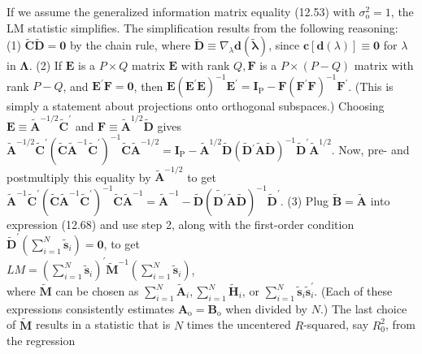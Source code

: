 \documentclass[10pt]{article}
\begin{document}
If we assume the generalized information matrix equality (12.53) with $\sigma_{\mathrm{o}}^{2}=1$, the LM statistic simplifies. The simplification results from the following reasoning: (1) $\tilde{\mathbf{C}} \tilde{\mathbf{D}}=\mathbf{0}$ by the chain rule, where $\tilde{\mathbf{D}} \equiv \nabla_{\lambda} \mathbf{d}(\tilde{\boldsymbol{\lambda}})$, since $\mathbf{c}[\mathbf{d}(\lambda)] \equiv \mathbf{0}$ for $\lambda$ in $\boldsymbol{\Lambda}$. (2) If $\mathbf{E}$ is a $P \times Q$ matrix $\mathbf{E}$ with rank $Q, \mathbf{F}$ is a $P \times(P-Q)$ matrix with rank $P-Q$, and $\mathbf{E}^{\prime} \mathbf{F}=\mathbf{0}$, then $\mathbf{E}\left(\mathbf{E}^{\prime} \mathbf{E}\right)^{-1} \mathbf{E}^{\prime}=\mathbf{I}_{\mathrm{P}}-\mathbf{F}\left(\mathbf{F}^{\prime} \mathbf{F}\right)^{-1} \mathbf{F}^{\prime}$. (This is simply a statement about projections onto orthogonal subspaces.) Choosing $\mathbf{E} \equiv \tilde{\mathbf{A}}^{-1 / 2} \tilde{\mathbf{C}}^{\prime}$ and $\mathbf{F} \equiv \tilde{\mathbf{A}}^{1 / 2} \tilde{\mathbf{D}}$ gives $\tilde{\mathbf{A}}^{-1 / 2} \tilde{\mathbf{C}}^{\prime}\left(\tilde{\mathbf{C}} \tilde{\mathbf{A}}^{-1} \tilde{\mathbf{C}}^{\prime}\right)^{-1} \tilde{\mathbf{C}} \tilde{\mathbf{A}}^{-1 / 2}=\mathbf{I}_{\mathrm{P}}-\tilde{\mathbf{A}}^{1 / 2} \tilde{\mathbf{D}}\left(\tilde{\mathbf{D}}{ }^{\prime} \tilde{\mathbf{A}} \tilde{\mathbf{D}}\right)^{-1} \tilde{\mathbf{D}}^{\prime} \tilde{\mathbf{A}}^{1 / 2}$. Now, pre- and postmultiply this equality by $\tilde{\mathbf{A}}^{-1 / 2}$ to get $\tilde{\mathbf{A}}^{-1} \tilde{\mathbf{C}}^{\prime}\left(\tilde{\mathbf{C}} \tilde{\mathbf{A}}^{-1} \tilde{\mathbf{C}}^{\prime}\right)^{-1} \tilde{\mathbf{C}} \tilde{\mathbf{A}}^{-1}=\tilde{\mathbf{A}}^{-1}-\tilde{\mathbf{D}}\left(\tilde{\mathbf{D}^{\prime}} \tilde{\mathbf{A}} \tilde{\mathbf{D}}\right)^{-1} \tilde{\mathbf{D}}^{\prime}$. (3) Plug $\tilde{\mathbf{B}}=\tilde{\mathbf{A}}$ into expression (12.68) and use step 2, along with the first-order condition $\tilde{\mathbf{D}}^{\prime}\left(\sum_{i=1}^{N} \tilde{\mathbf{s}}_{i}\right)=\mathbf{0}$, to get\\
$L M=\left(\sum_{i=1}^{N} \tilde{\mathbf{s}}_{i}\right)^{\prime} \tilde{\mathbf{M}}^{-1}\left(\sum_{i=1}^{N} \tilde{\mathbf{s}}_{i}\right)$,\\
where $\tilde{\mathbf{M}}$ can be chosen as $\sum_{i=1}^{N} \tilde{\mathbf{A}}_{i}, \sum_{i=1}^{N} \tilde{\mathbf{H}}_{i}$, or $\sum_{i=1}^{N} \tilde{\mathbf{s}}_{i} \tilde{\mathbf{s}}_{i}^{\prime}$. (Each of these expressions consistently estimates $\mathbf{A}_{\mathrm{o}}=\mathbf{B}_{\mathrm{o}}$ when divided by $N$.) The last choice of $\tilde{\mathbf{M}}$ results in a statistic that is $N$ times the uncentered $R$-squared, say $R_{0}^{2}$, from the regression
\end{document}
